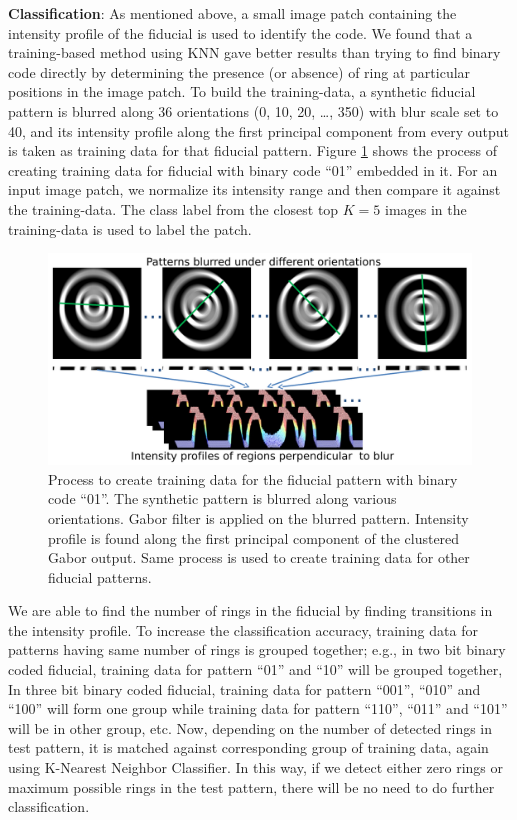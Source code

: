 \documentclass[runningheads]{llncs}
\begin{document}
\noindent\textbf{Classification}: As mentioned above, a small image patch containing
the intensity profile of the fiducial is used to identify the code.   We found
that a training-based method using KNN gave better results than trying to
find binary code directly by determining the presence (or absence) of ring
 at particular positions in the image patch. To build
 the training-data, a synthetic fiducial pattern is blurred along 36 orientations (0, 10, 20, \ldots , 350) with blur scale set to 40, and its intensity profile along the first principal component from every output is
taken as training data for that fiducial pattern. Figure
\ref{fig:training_data} shows the process of creating training data for
fiducial with binary code ``01'' embedded in it.  For an input image patch, we
normalize its intensity range and then compare it against the training-data.
The class label from the closest top $K=5$ images in the training-data is used
to label the patch.

\begin{figure}[h!]
\centering
  \includegraphics[width=\linewidth]{training_data.pdf}
  \caption{Process to create training data for the fiducial pattern with binary
  code ``01''. The synthetic pattern is blurred along various orientations. Gabor
  filter is applied on the blurred pattern. Intensity profile is found along the
  first principal component of the clustered Gabor output. Same process is used
  to create training data for other fiducial patterns.}
  \label{fig:training_data}
\end{figure}

We are able to find the number of rings in the fiducial by finding transitions
in the intensity profile. To increase the classification accuracy, training data
for patterns having same number of rings is grouped together; e.g., in two bit
binary coded fiducial, training data for pattern ``01'' and ``10'' will be
grouped together, In three bit binary coded fiducial, training data for pattern
``001'', ``010'' and ``100'' will form one group while training data for
pattern ``110'', ``011'' and ``101'' will be in other group, etc. Now,
depending on the number of detected rings in test pattern, it is matched
against corresponding group of training data, again using  K-Nearest Neighbor
Classifier. In this way, if we detect either zero rings or maximum possible
rings in the test pattern, there will be no need to do further classification.
\end{document}
